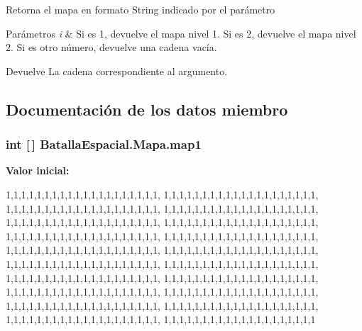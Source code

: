 \label{classBatallaEspacial_1_1Mapa_ad96b5ce682c66c4e8c60803a9c4c6e0c}
Retorna el mapa en formato String indicado por el parámetro 
\begin{DoxyParams}{Parámetros}
{\em i} & Si es 1, devuelve el mapa nivel 1. Si es 2, devuelve el mapa nivel 2. Si es otro número, devuelve una cadena vacía. \\
\hline
\end{DoxyParams}
\begin{DoxyReturn}{Devuelve}
La cadena correspondiente al argumento. 
\end{DoxyReturn}


\subsection{Documentación de los datos miembro}
\hypertarget{classBatallaEspacial_1_1Mapa_a77f0db578cd59ecca2b0671ed0c935ca}{
\subsubsection[{map1}]{\setlength{\rightskip}{0pt plus 5cm}int \mbox{[}$\,$\mbox{]} {\bf BatallaEspacial.Mapa.map1}}}
\label{classBatallaEspacial_1_1Mapa_a77f0db578cd59ecca2b0671ed0c935ca}
{\bfseries Valor inicial:}
\begin{DoxyCode}
 {  
            1,1,1,1,1,1,1,1,1,1,1,1,1,1,1,1,1,1,1,1,
            1,1,1,1,1,1,1,1,1,1,1,1,1,1,1,1,1,1,1,1,
            1,1,1,1,1,1,1,1,1,1,1,1,1,1,1,1,1,1,1,1,
            1,1,1,1,1,1,1,1,1,1,1,1,1,1,1,1,1,1,1,1,
            1,1,1,1,1,1,1,1,1,1,1,1,1,1,1,1,1,1,1,1,
            1,1,1,1,1,1,1,1,1,1,1,1,1,1,1,1,1,1,1,1,
            1,1,1,1,1,1,1,1,1,1,1,1,1,1,1,1,1,1,1,1,
            1,1,1,1,1,1,1,1,1,1,1,1,1,1,1,1,1,1,1,1,
            1,1,1,1,1,1,1,1,1,1,1,1,1,1,1,1,1,1,1,1,
            1,1,1,1,1,1,1,1,1,1,1,1,1,1,1,1,1,1,1,1,
            1,1,1,1,1,1,1,1,1,1,1,1,1,1,1,1,1,1,1,1,
            1,1,1,1,1,1,1,1,1,1,1,1,1,1,1,1,1,1,1,1,
            1,1,1,1,1,1,1,1,1,1,1,1,1,1,1,1,1,1,1,1,
            1,1,1,1,1,1,1,1,1,1,1,1,1,1,1,1,1,1,1,1,
            1,1,1,1,1,1,1,1,1,1,1,1,1,1,1,1,1,1,1,1,
            1,1,1,1,1,1,1,1,1,1,1,1,1,1,1,1,1,1,1,1,
            1,1,1,1,1,1,1,1,1,1,1,1,1,1,1,1,1,1,1,1,
            1,1,1,1,1,1,1,1,1,1,1,1,1,1,1,1,1,1,1,1,
            1,1,1,1,1,1,1,1,1,1,1,1,1,1,1,1,1,1,1,1,
            1,1,1,1,1,1,1,1,1,1,1,1,1,1,1,1,1,1,1,1
        }
\end{DoxyCode}
